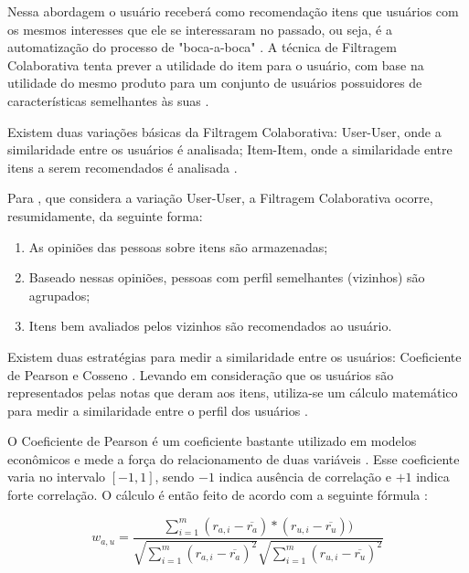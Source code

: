 Nessa abordagem o usuário receberá como recomendação itens que usuários com os mesmos interesses que ele se
interessaram no passado, ou seja, é a automatização do processo de "boca-a-boca" \cite{jannach2010recommender}. A
técnica de Filtragem Colaborativa tenta prever a utilidade  do item para o usuário, com base na utilidade do mesmo
produto para um conjunto de usuários  possuidores de características semelhantes às suas \cite{jannach2010recommender}.

Existem duas variações básicas da Filtragem Colaborativa: User-User, onde a similaridade entre os usuários é analisada;
Item-Item, onde a similaridade entre itens a serem recomendados é analisada \cite{jannach2010recommender}.

Para , que considera a variação User-User, a Filtragem Colaborativa ocorre,
resumidamente, da seguinte forma:

\begin{enumerate}
\item As opiniões das pessoas sobre itens são armazenadas;
\item Baseado nessas opiniões, pessoas com perfil semelhantes (vizinhos) são agrupados;
\item Itens bem avaliados pelos vizinhos são recomendados ao usuário.
\end{enumerate}

Existem duas estratégias para medir a similaridade entre os usuários: Coeficiente de Pearson e Cosseno
\cite{torres2004personalizaccao}. Levando em consideração que os usuários são representados pelas notas que deram aos
itens, utiliza-se um cálculo matemático para medir a similaridade entre o perfil dos usuários
\cite{torres2004personalizaccao}.

O Coeficiente de Pearson é um coeficiente bastante utilizado em modelos econômicos e mede a força do relacionamento
de duas variáveis \cite{torres2004personalizaccao}. Esse coeficiente varia no intervalo $[-1, 1]$, sendo $-1$ indica
ausência de correlação e $+1$ indica forte correlação. O cálculo é então feito de acordo com a seguinte fórmula
\cite{torres2004personalizaccao}:

\begin{equation}
  w_{a,u} = \frac{\sum_{i=1}^{m}(r_{a,i} - \overline{r_a})*(r_{u,i} - \overline{r_u}))}{\sqrt{\sum_{i=1}^{m}(r_{a,i} - \overline{r_a})^2} \sqrt{\sum_{i=1}^{m}(r_{u,i} - \overline{r_u})^2}}
  \label{eq:pearson}
\end{equation}


